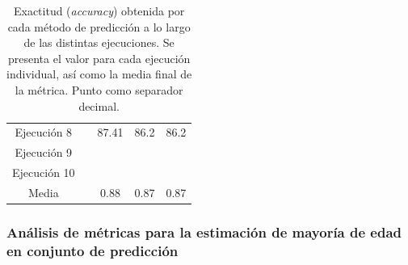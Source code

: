 \begin{table}[h]
\begin{tabular}{ccccc}
    Ejecución 8                      &  & 87.41                       & 86.2                       & 86.2                       \\
    Ejecución 9                      &  &                             &                            &                            \\
    Ejecución 10                     &  &                             &                            &                            \\ \cline{1-1} \cline{3-5} 
    Media                            &  & 0.88                        & 0.87                       & 0.87                       \\ 
    \bottomrule
    \end{tabular}
    \caption[
        Exactitud (\textit{accuracy}) obtenida por cada método de predicción a lo largo de las distintas ejecuciones. 
    ]{   
        Exactitud (\textit{accuracy}) obtenida por cada método de predicción a lo largo de las distintas ejecuciones. 
        Se presenta el valor para cada ejecución individual, así como la media final de la métrica.
        Punto como separador decimal.
    }
    \label{tab:AMM_accuracy_comparative}
\end{table}


\FloatBarrier


\subsubsection{Análisis de métricas para la estimación de mayoría de edad en conjunto de predicción}

